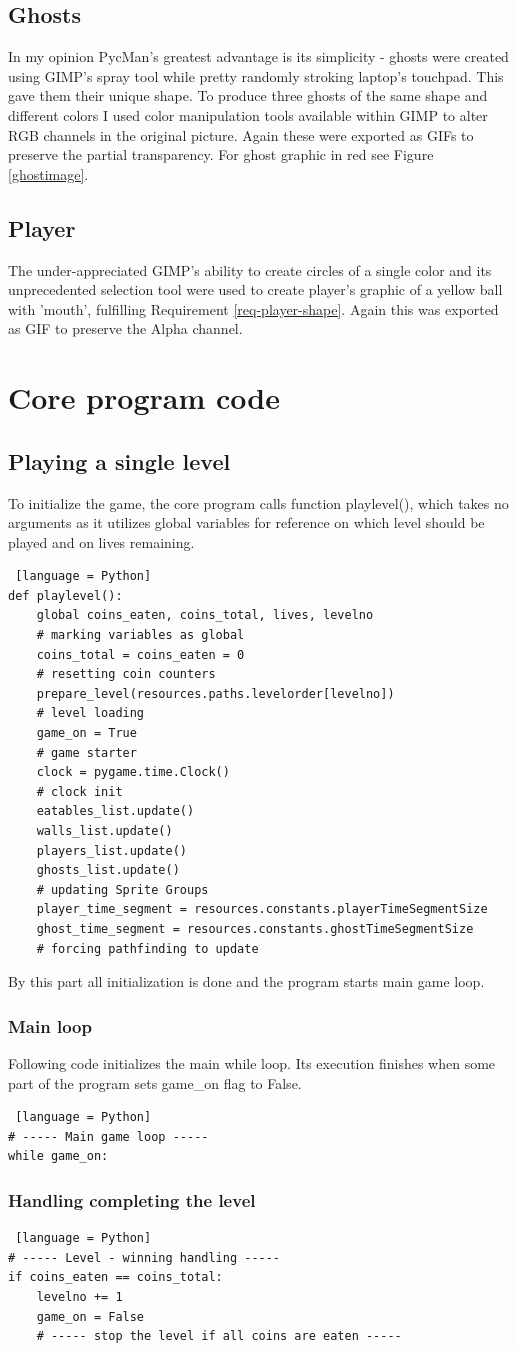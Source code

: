 \documentclass[11pt,a4paper]{report}
\newcommand{\dsubsection}[1]{\FloatBarrier \subsection{#1}}
\begin{document}
			\dsubsection{Ghosts}
				In my opinion PycMan's greatest advantage is its simplicity - ghosts were created using GIMP's spray tool while pretty randomly stroking laptop's touchpad. This gave them their unique shape. To produce three ghosts of the same shape and different colors I used color manipulation tools available within GIMP to alter RGB channels in the original picture. Again these were exported as GIFs to preserve the partial transparency. For ghost graphic in red see Figure \ref{ghostimage}.
			\dsubsection{Player}
				The under-appreciated GIMP's ability to create circles of a single color and its unprecedented selection tool were used to create player's graphic of a yellow ball with 'mouth', fulfilling Requirement \ref{req-player-shape}. Again this was exported as GIF to preserve the Alpha channel.
		\section{Core program code}
			\dsubsection{Playing a single level}
				To initialize the game, the core program calls function playlevel(), which takes no arguments as it utilizes global variables for reference on which level should be played and on lives remaining.
				\begin{lstlisting} [language = Python]
def playlevel():
	global coins_eaten, coins_total, lives, levelno
	# marking variables as global
	coins_total = coins_eaten = 0
	# resetting coin counters
	prepare_level(resources.paths.levelorder[levelno])
	# level loading
	game_on = True
	# game starter
	clock = pygame.time.Clock()
	# clock init
	eatables_list.update()
	walls_list.update()
	players_list.update()
	ghosts_list.update()
	# updating Sprite Groups
	player_time_segment = resources.constants.playerTimeSegmentSize
	ghost_time_segment = resources.constants.ghostTimeSegmentSize
	# forcing pathfinding to update
				\end{lstlisting}
				By this part all initialization is done and the program starts main game loop.
				\subsubsection{Main loop}
					Following code initializes the main while loop. Its execution finishes when some part of the program sets game\_on flag to False.
					\begin{lstlisting} [language = Python]
# ----- Main game loop -----
while game_on:
					\end{lstlisting}
				\subsubsection{Handling completing the level}
					\begin{lstlisting} [language = Python]
# ----- Level - winning handling -----
if coins_eaten == coins_total:
	levelno += 1
	game_on = False
	# ----- stop the level if all coins are eaten -----
					\end{lstlisting}
\end{document}
